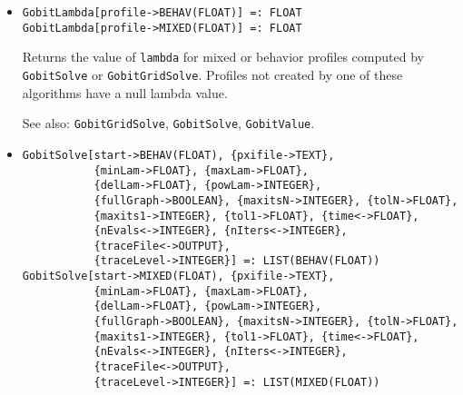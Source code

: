 \begin{itemize}
\item
\protect \large \begin{verbatim}
GobitLambda[profile->BEHAV(FLOAT)] =: FLOAT
GobitLambda[profile->MIXED(FLOAT)] =: FLOAT
\end{verbatim}\normalsize

\bd
Returns the value of \verb+lambda+ for mixed or behavior profiles
computed by \verb+GobitSolve+ or \verb+GobitGridSolve+.  Profiles not
created by one of these algorithms have a null lambda value.
\item
[See also:] \verb+GobitGridSolve+, \verb+GobitSolve+, \verb+GobitValue+.
\ed

\item
\protect \large \begin{verbatim}
GobitSolve[start->BEHAV(FLOAT), {pxifile->TEXT},
           {minLam->FLOAT}, {maxLam->FLOAT},
           {delLam->FLOAT}, {powLam->INTEGER},
           {fullGraph->BOOLEAN}, {maxitsN->INTEGER}, {tolN->FLOAT},
           {maxits1->INTEGER}, {tol1->FLOAT}, {time<->FLOAT},
           {nEvals<->INTEGER}, {nIters<->INTEGER},
           {traceFile<->OUTPUT},
           {traceLevel->INTEGER}] =: LIST(BEHAV(FLOAT))
GobitSolve[start->MIXED(FLOAT), {pxifile->TEXT},
           {minLam->FLOAT}, {maxLam->FLOAT},
           {delLam->FLOAT}, {powLam->INTEGER},
           {fullGraph->BOOLEAN}, {maxitsN->INTEGER}, {tolN->FLOAT},
           {maxits1->INTEGER}, {tol1->FLOAT}, {time<->FLOAT},
           {nEvals<->INTEGER}, {nIters<->INTEGER},
           {traceFile<->OUTPUT},
           {traceLevel->INTEGER}] =: LIST(MIXED(FLOAT))
\end{verbatim}\normalsize


\end{itemize}
